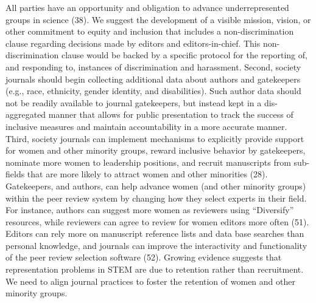 \documentclass[11pt,]{article}
\begin{document}
All parties have an opportunity and obligation to advance
underrepresented groups in science (38). We suggest the development of a
visible mission, vision, or other commitment to equity and inclusion
that includes a non-discrimination clause regarding decisions made by
editors and editors-in-chief. This non-discrimination clause would be
backed by a specific protocol for the reporting of, and responding to,
instances of discrimination and harassment. Second, society journals
should begin collecting additional data about authors and gatekeepers
(e.g., race, ethnicity, gender identity, and disabilities). Such author
data should not be readily available to journal gatekeepers, but instead
kept in a dis-aggregated manner that allows for public presentation to
track the success of inclusive measures and maintain accountability in a
more accurate manner. Third, society journals can implement mechanisms
to explicitly provide support for women and other minority groups,
reward inclusive behavior by gatekeepers, nominate more women to
leadership positions, and recruit manuscripts from sub-fields that are
more likely to attract women and other minorities (28). Gatekeepers, and
authors, can help advance women (and other minority groups) within the
peer review system by changing how they select experts in their field.
For instance, authors can suggest more women as reviewers using
``Diversify'' resources, while reviewers can agree to review for women
editors more often (51). Editors can rely more on manuscript reference
lists and data base searches than personal knowledge, and journals can
improve the interactivity and functionality of the peer review selection
software (52). Growing evidence suggests that representation problems in
STEM are due to retention rather than recruitment. We need to align
journal practices to foster the retention of women and other minority
groups.
\end{document}
